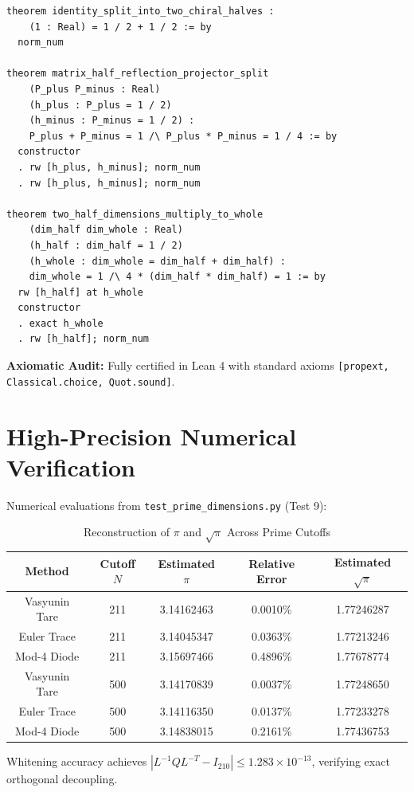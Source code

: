 \documentclass[11pt,a4paper]{article}
\theoremstyle{definition}
\begin{document}
\begin{lstlisting}[language=Lean4]
theorem identity_split_into_two_chiral_halves :
    (1 : Real) = 1 / 2 + 1 / 2 := by
  norm_num

theorem matrix_half_reflection_projector_split
    (P_plus P_minus : Real)
    (h_plus : P_plus = 1 / 2)
    (h_minus : P_minus = 1 / 2) :
    P_plus + P_minus = 1 /\ P_plus * P_minus = 1 / 4 := by
  constructor
  . rw [h_plus, h_minus]; norm_num
  . rw [h_plus, h_minus]; norm_num

theorem two_half_dimensions_multiply_to_whole
    (dim_half dim_whole : Real)
    (h_half : dim_half = 1 / 2)
    (h_whole : dim_whole = dim_half + dim_half) :
    dim_whole = 1 /\ 4 * (dim_half * dim_half) = 1 := by
  rw [h_half] at h_whole
  constructor
  . exact h_whole
  . rw [h_half]; norm_num
\end{lstlisting}

\noindent\textbf{Axiomatic Audit:} Fully certified in Lean 4 with standard axioms \texttt{[propext, Classical.choice, Quot.sound]}.


\section{High-Precision Numerical Verification}

Numerical evaluations from \texttt{test\_prime\_dimensions.py} (Test 9):

\begin{table}[htbp]
\centering
\caption{Reconstruction of $\pi$ and $\sqrt{\pi}$ Across Prime Cutoffs}
\begin{tabular}{ccccc}
\toprule
Method & Cutoff $N$ & Estimated $\pi$ & Relative Error & Estimated $\sqrt{\pi}$ \\
\midrule
Vasyunin Tare & 211 & 3.14162463 & 0.0010\% & 1.77246287 \\
Euler Trace & 211 & 3.14045347 & 0.0363\% & 1.77213246 \\
Mod-4 Diode & 211 & 3.15697466 & 0.4896\% & 1.77678774 \\
\addlinespace
Vasyunin Tare & 500 & 3.14170839 & 0.0037\% & 1.77248650 \\
Euler Trace & 500 & 3.14116350 & 0.0137\% & 1.77233278 \\
Mod-4 Diode & 500 & 3.14838015 & 0.2161\% & 1.77436753 \\
\bottomrule
\end{tabular}
\end{table}

\noindent Whitening accuracy achieves $|L^{-1} Q L^{-T} - I_{210}| \le 1.283 \times 10^{-13}$, verifying exact orthogonal decoupling.
\end{document}
